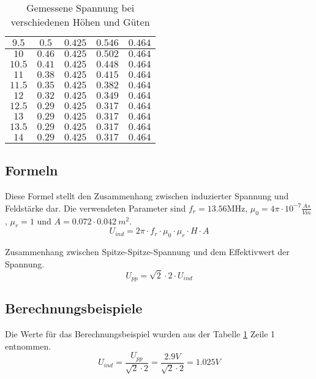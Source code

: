 \documentclass[12pt,a4paper,ngerman]{article}
\begin{document}
\begin{table}[H]
\begin{center}
\begin{tabular}{ |c|c|c|c|c| }
  $9.5$ & $0.5$ & $0.425$ & $0.546$ & $0.464$ \\
      \hline
  $10$ & $0.46$ & $0.425$ & $0.502$ & $0.464$ \\
      \hline
  $10.5$ & $0.41$ & $0.425$ & $0.448$ & $0.464$ \\
      \hline
  $11$ & $0.38$ & $0.425$ & $0.415$ & $0.464$ \\
      \hline
  $11.5$ & $0.35$ & $0.425$ & $0.382$ & $0.464$ \\
      \hline
  $12$ & $0.32$ & $0.425$ & $0.349$ & $0.464$ \\
      \hline
  $12.5$ & $0.29$ & $0.425$ & $0.317$ & $0.464$ \\
      \hline
  $13$ & $0.29$ & $0.425$ & $0.317$ & $0.464$ \\
      \hline
  $13.5$ & $0.29$ & $0.425$ & $0.317$ & $0.464$ \\
        \hline
  $14$ & $0.29$ & $0.425$ & $0.317$ & $0.464$ \\  \hline
\end{tabular}
\caption{Gemessene Spannung bei verschiedenen Höhen und Güten}
\end{center}
\label{tab:1}
\end{table}
\pagebreak
\subsection{Formeln}
Diese Formel stellt den Zusammenhang zwischen induzierter Spannung und Feldstärke dar. Die verwendeten Parameter sind $f_r = 13.56$MHz, $\mu_0 = 4\pi \cdot 10^{-7}\frac{As}{Vm}$, $\mu_r = 1$ und $A = 0.072 \cdot 0.042\ m^2$.
\begin{equation}
U_{ind} = 2\pi \cdot f_r \cdot \mu_0 \cdot \mu_r \cdot H \cdot A
\end{equation}

Zusammenhang zwischen Spitze-Spitze-Spannung und dem Effektivwert der Spannung.
\begin{equation}
U_{pp} = \sqrt{2}  \cdot 2 \cdot U_{ind}
\end{equation}

\subsection{Berechnungsbeispiele}
Die Werte für das Berechnungsbeispiel wurden aus der Tabelle \ref{tab:1} Zeile 1 entnommen.
\begin{equation}
U_{ind} = \frac{U_{pp}}{\sqrt{2}  \cdot 2} = \frac{2.9V}{\sqrt{2}  \cdot 2} = 1.025V
\end{equation}
\end{document}
